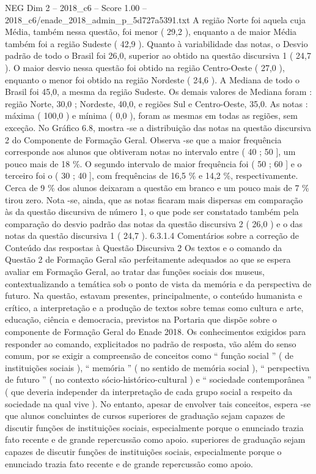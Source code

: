 \begin{textsample}{NEG Dim 2 – 2018\_c6 – Score 1.00 – 2018\_c6/enade\_2018\_admin\_p\_5d727a5391.txt}
A região Norte foi aquela cuja Média, também nessa questão, foi menor ( 29,2 ), enquanto a de maior Média também foi a região Sudeste ( 42,9 ).
Quanto à variabilidade das notas, o Desvio padrão de todo o Brasil foi 26,0, superior ao obtido na questão discursiva 1 ( 24,7 ).
O maior desvio nessa questão foi obtido na região Centro-Oeste ( 27,0 ), enquanto o menor foi obtido na região Nordeste ( 24,6 ).
A Mediana de todo o Brasil foi 45,0, a mesma da região Sudeste.
Os demais valores de Mediana foram : região Norte, 30,0 ; Nordeste, 40,0, e regiões Sul e Centro-Oeste, 35,0.
As notas : máxima ( 100,0 ) e mínima ( 0,0 ), foram as mesmas em todas as regiões, sem exceção.
No Gráfico 6.8, mostra -se a distribuição das notas na questão discursiva 2 do Componente de Formação Geral.
Observa -se que a maior frequência corresponde aos alunos que obtiveram notas no intervalo entre ( 40 ; 50 ], um pouco mais de 18 \%.
O segundo intervalo de maior frequência foi ( 50 ; 60 ] e o terceiro foi o ( 30 ; 40 ], com frequências de 16,5 \% e 14,2 \%, respectivamente.
Cerca de 9 \% dos alunos deixaram a questão em branco e um pouco mais de 7 \% tirou zero.
Nota -se, ainda, que as notas ficaram mais dispersas em comparação às da questão discursiva de número 1, o que pode ser constatado também pela comparação do desvio padrão das notas da questão discursiva 2 ( 26,0 ) e o das notas da questão discursiva 1 ( 24,7 ). 6.3.1.4 Comentários sobre a correção de Conteúdo das respostas à Questão Discursiva 2 Os textos e o comando da Questão 2 de Formação Geral são perfeitamente adequados ao que se espera avaliar em Formação Geral, ao tratar das funções sociais dos museus, contextualizando a temática sob o ponto de vista da memória e da perspectiva de futuro.
Na questão, estavam presentes, principalmente, o conteúdo humanista e crítico, a interpretação e a produção de textos sobre temas como cultura e arte, educação, ciência e democracia, previstos na Portaria que dispõe sobre o componente de Formação Geral do Enade 2018.
Os conhecimentos exigidos para responder ao comando, explicitados no padrão de resposta, vão além do senso comum, por se exigir a compreensão de conceitos como “ função social ” ( de instituições sociais ), “ memória ” ( no sentido de memória social ), “ perspectiva de futuro ” ( no contexto sócio-histórico-cultural ) e “ sociedade contemporânea ” ( que deveria independer da interpretação de cada grupo social a respeito da sociedade na qual vive ).
No entanto, apesar de envolver tais conceitos, espera -se que alunos concluintes de cursos superiores de graduação sejam capazes de discutir funções de instituições sociais, especialmente porque o enunciado trazia fato recente e de grande repercussão como apoio. superiores de graduação sejam capazes de discutir funções de instituições sociais, especialmente porque o enunciado trazia fato recente e de grande repercussão como apoio.

\end{textsample}
